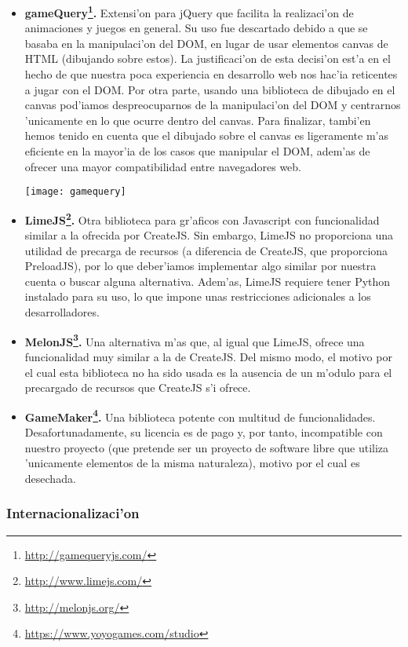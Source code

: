 \begin{itemize}
\item \textbf{gameQuery\footnote{\url{http://gamequeryjs.com/}}.} Extensi'on para jQuery que facilita la realizaci'on 
de animaciones y juegos en general. Su uso fue descartado debido a que se basaba en la manipulaci'on
del DOM, en lugar de usar elementos canvas de HTML (dibujando sobre estos). 
La justificaci'on de esta decisi'on est'a en el hecho de que nuestra poca experiencia en
desarrollo web nos hac'ia reticentes a jugar con el DOM. Por otra parte, usando una biblioteca
de dibujado en el canvas pod'iamos despreocuparnos de  la manipulaci'on del DOM y centrarnos
'unicamente en lo que ocurre dentro del canvas.
Para finalizar, tambi'en hemos tenido en cuenta que el dibujado sobre el canvas es ligeramente
m'as eficiente en la mayor'ia de los casos que manipular el DOM, adem'as de ofrecer una mayor
compatibilidad entre navegadores web.

\begin{center}
\texttt{[image: gamequery]}
\end{center}

\item \textbf{LimeJS\footnote{\url{http://www.limejs.com/}}.} Otra biblioteca para gr'aficos con Javascript con funcionalidad similar a la 
ofrecida por CreateJS. Sin embargo, LimeJS no proporciona una utilidad de precarga de recursos 
(a diferencia de CreateJS, que proporciona PreloadJS), por lo que deber'iamos implementar algo
similar por nuestra cuenta o buscar alguna alternativa. Adem'as, LimeJS requiere tener Python
instalado para su uso, lo que impone unas restricciones adicionales a los desarrolladores.
\item \textbf{MelonJS\footnote{\url{http://melonjs.org/}}.} Una alternativa m'as que, al igual que LimeJS, ofrece una funcionalidad muy similar
a la de CreateJS. Del mismo modo, el motivo por el cual esta biblioteca no ha sido usada es la 
ausencia de un m'odulo para el precargado de recursos que CreateJS s'i ofrece.
\item \textbf{GameMaker\footnote{\url{https://www.yoyogames.com/studio}}.} Una biblioteca potente con multitud de funcionalidades. Desafortunadamente, su
licencia es de pago y, por tanto, incompatible con nuestro proyecto (que pretende ser un proyecto
de software libre que utiliza 'unicamente elementos de la misma naturaleza), motivo por el cual 
es desechada.
\end{itemize}

\subsubsection{Internacionalizaci'on}
\label{sub:internacionalizacion}

